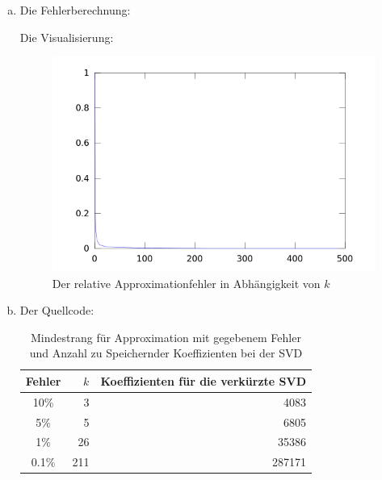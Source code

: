 \documentclass{mywork}
\begin{document}
\begin{aufgabe}
	\begin{enumerate}[a)]
		\item
			Die Fehlerberechnung:
			
			Die Visualisierung:
			
			\begin{figure}[h]
				\centering
				\caption{Der relative Approximationfehler in Abhängigkeit von $k$}
				\includegraphics[scale=0.6]{num1_6_4/error.png}
			\end{figure}
\newpage
		\item			
			Der Quellcode:
			
			\begin{table}[h]
				\centering
				\caption{Mindestrang für Approximation mit gegebenem Fehler und Anzahl zu Speichernder Koeffizienten bei der SVD}
				\begin{tabular}{c|r|r}
					Fehler & $k$ & Koeffizienten für die verkürzte SVD \\ \hline
					10\% & 3 & 4083 \\
					5\% & 5 & 6805 \\
					1\% & 26 & 35386 \\
					0.1\% & 211 & 287171 
				\end{tabular}
			\end{table}


\end{enumerate}
\end{aufgabe}
\end{document}
